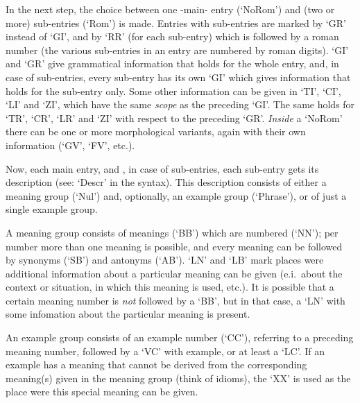 In the next step, the choice between one -main- entry (`NoRom')
and (two or more) sub-entries (`Rom') is
made. Entries with sub-entries are marked by `GR' instead of `GI', and by 
`RR' (for each sub-entry) which is
followed by a roman number (the various sub-entries in an entry are numbered 
by roman digits). `GI' and `GR' give grammatical information that holds for the
whole entry, and, in case of sub-entries, every sub-entry has its own `GI' which
gives information that holds for the sub-entry only. Some other
information can be given in `TI', `CI', `LI' and `ZI', which have the same 
{\em scope} as the preceding `GI'. The same holds for `TR', `CR', `LR' and `ZI'
with respect to the preceding `GR'. {\em Inside} a `NoRom' there can be one or
more morphological variants, again with their own information (`GV', `FV', 
etc.).

Now, each main entry, and , in case of sub-entries, each sub-entry gets its
description (see: `Descr' in the syntax). This description consists of
either a meaning group (`Nul') and, optionally, an example group (`Phrase'),
or of just a single example group.

A meaning group consists of meanings (`BB') which are numbered (`NN'); per 
number more than one meaning is possible, and every meaning can be followed 
by synonyms (`SB') and antonyms (`AB'). `LN' and `LB' mark 
places were additional information about a particular meaning can be given 
(e.i.\ about the context or situation, in which this meaning is used, etc.).
It is possible that a certain meaning number is {\em not} followed by a 
`BB', but in that case, a `LN' with some infomation about the particular
meaning is present.

An example group consists of an example number (`CC'),
referring to a preceding meaning number, followed by a `VC' with 
example, or at least a `LC'. If an example has a meaning that cannot be
derived from the corresponding meaning(s) given in the meaning group
(think of idioms), the
`XX' is used as the place were this special meaning can be given.

